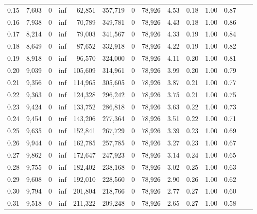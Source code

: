 \begin{tabular}{rrrrrrrrrrrrrr}
0.15 &  7,603 &      0 &      inf &   62,851 &  357,719 &       0 &  78,926 &  4.53 &  0.18 &  1.00 &      0.87 \\
0.16 &  7,938 &      0 &      inf &   70,789 &  349,781 &       0 &  78,926 &  4.43 &  0.18 &  1.00 &      0.86 \\
0.17 &  8,214 &      0 &      inf &   79,003 &  341,567 &       0 &  78,926 &  4.33 &  0.19 &  1.00 &      0.84 \\
0.18 &  8,649 &      0 &      inf &   87,652 &  332,918 &       0 &  78,926 &  4.22 &  0.19 &  1.00 &      0.82 \\
0.19 &  8,918 &      0 &      inf &   96,570 &  324,000 &       0 &  78,926 &  4.11 &  0.20 &  1.00 &      0.81 \\
0.20 &  9,039 &      0 &      inf &  105,609 &  314,961 &       0 &  78,926 &  3.99 &  0.20 &  1.00 &      0.79 \\
0.21 &  9,356 &      0 &      inf &  114,965 &  305,605 &       0 &  78,926 &  3.87 &  0.21 &  1.00 &      0.77 \\
0.22 &  9,363 &      0 &      inf &  124,328 &  296,242 &       0 &  78,926 &  3.75 &  0.21 &  1.00 &      0.75 \\
0.23 &  9,424 &      0 &      inf &  133,752 &  286,818 &       0 &  78,926 &  3.63 &  0.22 &  1.00 &      0.73 \\
0.24 &  9,454 &      0 &      inf &  143,206 &  277,364 &       0 &  78,926 &  3.51 &  0.22 &  1.00 &      0.71 \\
0.25 &  9,635 &      0 &      inf &  152,841 &  267,729 &       0 &  78,926 &  3.39 &  0.23 &  1.00 &      0.69 \\
0.26 &  9,944 &      0 &      inf &  162,785 &  257,785 &       0 &  78,926 &  3.27 &  0.23 &  1.00 &      0.67 \\
0.27 &  9,862 &      0 &      inf &  172,647 &  247,923 &       0 &  78,926 &  3.14 &  0.24 &  1.00 &      0.65 \\
0.28 &  9,755 &      0 &      inf &  182,402 &  238,168 &       0 &  78,926 &  3.02 &  0.25 &  1.00 &      0.63 \\
0.29 &  9,608 &      0 &      inf &  192,010 &  228,560 &       0 &  78,926 &  2.90 &  0.26 &  1.00 &      0.62 \\
0.30 &  9,794 &      0 &      inf &  201,804 &  218,766 &       0 &  78,926 &  2.77 &  0.27 &  1.00 &      0.60 \\
0.31 &  9,518 &      0 &      inf &  211,322 &  209,248 &       0 &  78,926 &  2.65 &  0.27 &  1.00 &      0.58 \\

\end{tabular}
